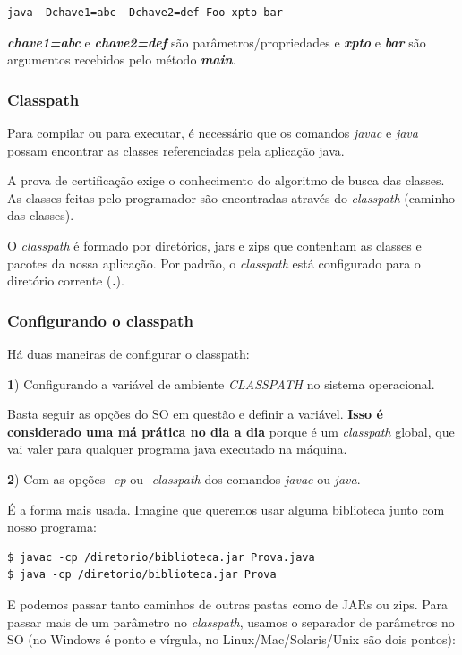\documentclass[12pt]{article}
\begin{document}
\begin{lstlisting}
java -Dchave1=abc -Dchave2=def Foo xpto bar
\end{lstlisting}

\textbf{\textit{chave1=abc}} e \textbf{\textit{chave2=def}} são parâmetros/propriedades e \textbf{\textit{xpto}} e \textbf{\textit{bar}} são argumentos recebidos pelo método \textbf{\textit{main}}.

\subsubsection{Classpath}

Para compilar ou para executar, é necessário que os comandos \textit{javac} e \textit{java} possam encontrar as classes referenciadas pela aplicação java.

A prova de certificação exige o conhecimento do algoritmo de busca das classes. As classes feitas pelo programador são encontradas através do \textit{classpath} (caminho das classes).

O \textit{classpath} é formado por diretórios, jars e zips que contenham as classes e pacotes da nossa aplicação. Por padrão, o \textit{classpath} está configurado para o diretório corrente (\textit{\textbf{.}}).

\subsubsection{Configurando o classpath}

Há duas maneiras de configurar o classpath:

\textbf{1}) Configurando a variável de ambiente \textit{CLASSPATH} no sistema operacional.

Basta seguir as opções do SO em questão e definir a variável. \textbf{Isso é considerado uma má prática no dia a dia} porque é um \textit{classpath} global, que vai valer para qualquer programa java executado na máquina.

\textbf{2}) Com as opções \textit{-cp} ou \textit{-classpath} dos comandos \textit{javac} ou \textit{java}.

É a forma mais usada. Imagine que queremos usar alguma biblioteca junto com nosso programa:

\begin{lstlisting}
$ javac -cp /diretorio/biblioteca.jar Prova.java
$ java -cp /diretorio/biblioteca.jar Prova
\end{lstlisting}

E podemos passar tanto caminhos de outras pastas como de JARs ou zips. Para passar mais de um parâmetro no \textit{classpath}, usamos o separador de parâmetros no SO (no Windows é ponto e vírgula, no Linux/Mac/Solaris/Unix são dois pontos):
\end{document}
